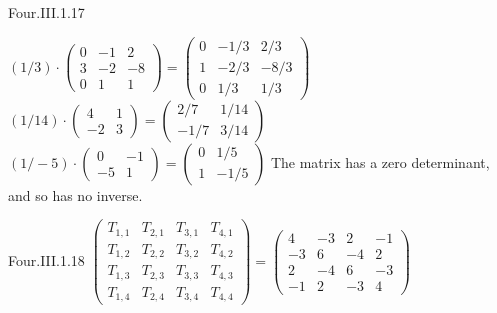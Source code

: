 \begin{ans}{Four.III.1.17}
      \begin{exparts}
        \partsitem $(1/3)\cdot
           \begin{pmatrix}
             0  &-1  &2  \\
             3  &-2  &-8 \\
             0  &1   &1
          \end{pmatrix}
          =
          \begin{pmatrix}
            0  &-1/3  &2/3  \\
            1  &-2/3  &-8/3 \\
            0  &1/3   &1/3
          \end{pmatrix}$
        \partsitem $(1/14)\cdot
          \begin{pmatrix}
            4  &1  \\
           -2  &3
          \end{pmatrix}
          =
          \begin{pmatrix}
            2/7  &1/14  \\
           -1/7  &3/14
          \end{pmatrix}$
        \partsitem $(1/-5)\cdot
          \begin{pmatrix}
               0  &-1 \\
              -5  &1
          \end{pmatrix}
          =
          \begin{pmatrix}
            0  &1/5 \\
            1  &-1/5
          \end{pmatrix}$
        \partsitem The matrix has a zero determinant, and so
           has no inverse.
      \end{exparts}
    
\end{ans}
\begin{ans}{Four.III.1.18}
      $\begin{pmatrix}
        T_{1,1}  &T_{2,1}  &T_{3,1}  &T_{4,1}  \\
        T_{1,2}  &T_{2,2}  &T_{3,2}  &T_{4,2}  \\
        T_{1,3}  &T_{2,3}  &T_{3,3}  &T_{4,3}  \\
        T_{1,4}  &T_{2,4}  &T_{3,4}  &T_{4,4}
      \end{pmatrix}
      =
      \begin{pmatrix}
        4  &-3  &2  &-1  \\
       -3  &6   &-4 &2   \\
        2  &-4  &6  &-3  \\
        -1 &2  &-3  &4
      \end{pmatrix}$
    
\end{ans}
